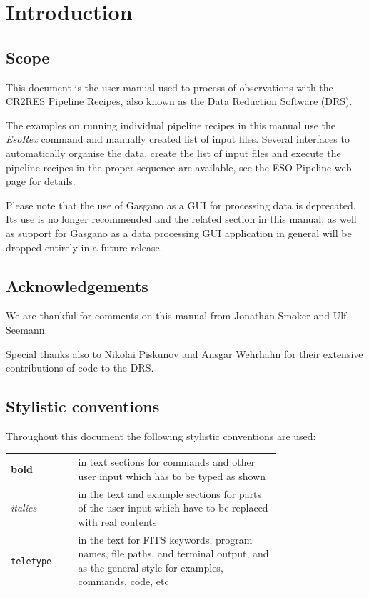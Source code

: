 \section{Introduction}
\label{sec:introduction}

\subsection{Scope}
\label{sec:scope}
This document is the user manual used to process of \instrument{}
observations with the CR2RES
Pipeline Recipes, also known as the \instrument{} Data Reduction Software 
(DRS).

The examples on running individual pipeline recipes in this manual use the
\textit{EsoRex} command and manually created list of input files. Several interfaces to
automatically organise the data, create the list of input files and execute
the pipeline recipes in the proper sequence are available, see the ESO
Pipeline web page  for details.

Please note that the use of Gasgano as a GUI for processing data is deprecated. 
Its use is no longer recommended and the related section in this manual, as 
well as support for Gasgano as a data processing GUI application in general 
will be dropped entirely in a future release.


\subsection{Acknowledgements}
We are thankful for comments on this manual from Jonathan Smoker and Ulf
Seemann.

Special thanks also to Nikolai Piskunov and Ansgar
Wehrhahn for their extensive contributions of code
to the DRS.



\subsection{Stylistic conventions}
\label{sec:style}

Throughout this document the following stylistic conventions are used:

\begin{tabular}{lp{0.75\linewidth}}
\textbf{bold}     & in text sections for commands and other
                    user input which has to be typed as shown \\
\textit{italics}  & in the text and example sections for parts of the user
                    input which have to be replaced with real contents \\
\texttt{teletype} & in the text for FITS keywords, program names, file paths,
                    and terminal output, and as the general style for examples,
                    commands, code, etc \\
\end{tabular}


